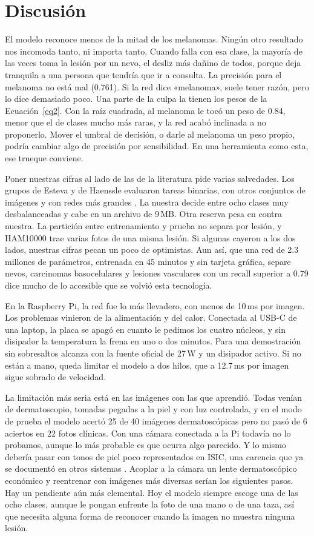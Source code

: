 \documentclass[pdflatex,sn-mathphys-num]{sn-jnl}%
\theoremstyle{thmstyleone}%
\theoremstyle{thmstyletwo}%
\theoremstyle{thmstylethree}%
\begin{document}
\section{Discusión}\label{sec12}

El modelo reconoce menos de la mitad de los melanomas. Ningún otro resultado nos incomoda tanto, ni importa tanto. Cuando falla con esa clase, la mayoría de las veces toma la lesión por un nevo, el desliz más dañino de todos, porque deja tranquila a una persona que tendría que ir a consulta. La precisión para el melanoma no está mal (0.761). Si la red dice «melanoma», suele tener razón, pero lo dice demasiado poco. Una parte de la culpa la tienen los pesos de la Ecuación~\eqref{eq2}. Con la raíz cuadrada, al melanoma le tocó un peso de 0.84, menor que el de clases mucho más raras, y la red acabó inclinada a no proponerlo. Mover el umbral de decisión, o darle al melanoma un peso propio, podría cambiar algo de precisión por sensibilidad. En una herramienta como esta, ese trueque conviene.

Poner nuestras cifras al lado de las de la literatura pide varias salvedades. Los grupos de Esteva y de Haenssle evaluaron tareas binarias, con otros conjuntos de imágenes y con redes más grandes \cite{esteva2017,haenssle2018}. La nuestra decide entre ocho clases muy desbalanceadas y cabe en un archivo de 9\,MB. Otra reserva pesa en contra nuestra. La partición entre entrenamiento y prueba no separa por lesión, y HAM10000 trae varias fotos de una misma lesión. Si algunas cayeron a los dos lados, nuestras cifras pecan un poco de optimistas. Aun así, que una red de 2.3 millones de parámetros, entrenada en 45 minutos y sin tarjeta gráfica, separe nevos, carcinomas basocelulares y lesiones vasculares con un recall superior a 0.79 dice mucho de lo accesible que se volvió esta tecnología.

En la Raspberry Pi, la red fue lo más llevadero, con menos de 10\,ms por imagen. Los problemas vinieron de la alimentación y del calor. Conectada al USB-C de una laptop, la placa se apagó en cuanto le pedimos los cuatro núcleos, y sin disipador la temperatura la frena en uno o dos minutos. Para una demostración sin sobresaltos alcanza con la fuente oficial de 27\,W y un disipador activo. Si no están a mano, queda limitar el modelo a dos hilos, que a 12.7\,ms por imagen sigue sobrado de velocidad.

La limitación más seria está en las imágenes con las que aprendió. Todas venían de dermatoscopio, tomadas pegadas a la piel y con luz controlada, y en el modo de prueba el modelo acertó 25 de 40 imágenes dermatoscópicas pero no pasó de 6 aciertos en 22 fotos clínicas. Con una cámara conectada a la Pi todavía no lo probamos, aunque lo más probable es que ocurra algo parecido. Y lo mismo debería pasar con tonos de piel poco representados en ISIC, una carencia que ya se documentó en otros sistemas \cite{daneshjou2022}. Acoplar a la cámara un lente dermatoscópico económico y reentrenar con imágenes más diversas serían los siguientes pasos. Hay un pendiente aún más elemental. Hoy el modelo siempre escoge una de las ocho clases, aunque le pongan enfrente la foto de una mano o de una taza, así que necesita alguna forma de reconocer cuando la imagen no muestra ninguna lesión.
\end{document}
